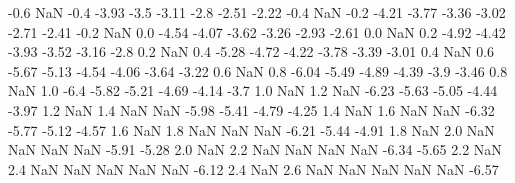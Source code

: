   -0.6   NaN  -0.4      -3.93     -3.5     -3.11     -2.8     -2.51     -2.22  
   -0.4   NaN  -0.2      -4.21     -3.77     -3.36     -3.02     -2.71     -2.41
   -0.2   NaN  0.0      -4.54     -4.07     -3.62     -3.26     -2.93     -2.61
   0.0   NaN  0.2      -4.92     -4.42     -3.93     -3.52     -3.16     -2.8
   0.2   NaN  0.4      -5.28     -4.72     -4.22     -3.78     -3.39     -3.01
   0.4   NaN  0.6      -5.67     -5.13     -4.54     -4.06     -3.64     -3.22
   0.6   NaN  0.8      -6.04     -5.49     -4.89     -4.39     -3.9     -3.46
   0.8   NaN  1.0      -6.4     -5.82     -5.21     -4.69     -4.14     -3.7
   1.0   NaN  1.2     NaN  -6.23     -5.63     -5.05     -4.44     -3.97
   1.2   NaN  1.4     NaN NaN  -5.98     -5.41     -4.79     -4.25
   1.4   NaN  1.6     NaN NaN  -6.32     -5.77     -5.12     -4.57
   1.6   NaN  1.8     NaN NaN NaN  -6.21     -5.44     -4.91
   1.8   NaN  2.0     NaN NaN NaN NaN  -5.91     -5.28
   2.0   NaN  2.2     NaN NaN NaN NaN  -6.34     -5.65
   2.2   NaN  2.4     NaN NaN NaN NaN NaN  -6.12
   2.4   NaN  2.6     NaN NaN NaN NaN NaN  -6.57
